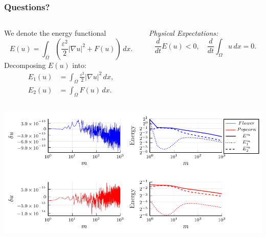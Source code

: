\begin{frame}
\frametitle{Questions?}
\end{frame}

\begin{frame}
\begin{center}

\begin{columns}
\begin{column}{0.5\textwidth}
    We denote the energy functional
    \begin{equation*}
        E(u) = \int_{\Omega} \left( \frac{\varepsilon^2}{2} |\nabla u|^2 + F(u) \right) \, dx.
    \end{equation*}
    Decomposing \( E(u) \) into:
    \begin{align*}
        E_{1}(u) &= \int_{\Omega} \frac{\varepsilon^2}{2} |\nabla u|^2 \, dx, \\
        E_{2}(u) &= \int_{\Omega} F(u) \, dx.
    \end{align*}
\end{column}

\begin{column}{0.5\textwidth}
    \textit{Physical Expectations:}
    \begin{equation*}
        \frac{d}{dt} E(u) < 0, \quad \frac{d}{dt} \int_{\Omega} u \, dx = 0.
    \end{equation*}
\end{column}
\end{columns}
\end{center}
\end{frame}
\begin{frame}
\begin{center}
    \includegraphics[width=1.0\textwidth]{CH-example/physical_energy.pdf}
\end{center}
\end{frame}


